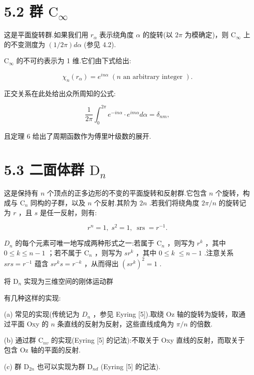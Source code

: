 \documentclass[10pt]{article}
\begin{document}
\section*{5.2 群 \({\mathrm{C}}_{\infty }\)}

这是平面旋转群.如果我们用 \({r}_{\alpha }\) 表示绕角度 \(\alpha\) 的旋转(以 \({2\pi }\) 为模确定)，则 \({\mathrm{C}}_{\infty }\) 上的不变测度为 \(\left( {1/{2\pi }}\right) {d\alpha }\) (参见 4.2).

\({\mathrm{C}}_{\infty }\) 的不可约表示为 1 维.它们由下式给出:

\[
{\chi }_{n}\left( {r}_{\alpha }\right)  = {e}^{in\alpha }\;\left( {n\text{ an arbitrary integer }}\right) .
\]

正交关系在此处给出众所周知的公式:

\[
\frac{1}{2\pi }{\int }_{0}^{2\pi }{e}^{-{in\alpha }} \cdot  {e}^{im\alpha }{d\alpha } = {\delta }_{nm},
\]

且定理 6 给出了周期函数作为傅里叶级数的展开.

\section*{5.3 二面体群 \({\mathrm{D}}_{n}\)}

这是保持有 \(n\) 个顶点的正多边形的不变的平面旋转和反射群.它包含 \(n\) 个旋转，构成与 \({\mathrm{C}}_{n}\) 同构的子群，以及 \(n\) 个反射.其阶为 \({2n}\) .若我们将绕角度 \({2\pi }/n\) 的旋转记为 \(r\) ，且 \(s\) 是任一反射，则有:

\[
{r}^{n} = 1,\;{s}^{2} = 1,\;\operatorname{srs} = {r}^{-1}.
\]

\({D}_{n}\) 的每个元素可唯一地写成两种形式之一:若属于 \({\mathrm{C}}_{n}\) ，则写为 \({r}^{k}\) ，其中 \(0 \leq  k \leq  n - 1\) ；若不属于 \({\mathrm{C}}_{n}\) ，则写为 \(s{r}^{k}\) ，其中 \(0 \leq  k \; \leq  n - 1\) .注意关系 \({srs} = {r}^{-1}\) 蕴含 \(s{r}^{k}s = {r}^{-k}\) ，从而得出 \({\left( s{r}^{k}\right) }^{2} = 1\) .

将 \({\mathrm{D}}_{n}\) 实现为三维空间的刚体运动群

有几种这样的实现:

(a) 常见的实现(传统记为 \({D}_{n}\) ，参见 Eyring [5]).取绕 Oz 轴的旋转为旋转，取通过平面 Oxy 的 \(n\) 条直线的反射为反射，这些直线成角为 \(\pi /n\) 的倍数.

(b) 通过群 \({\mathrm{C}}_{nv}\) 的实现(Eyring [5] 的记法):不取关于 Oxy 直线的反射，而取关于包含 Oz 轴的平面的反射.

(c) 群 \({\mathrm{D}}_{2n}\) 也可以实现为群 \({\mathrm{D}}_{nd}\) (Eyring [5] 的记法).
\end{document}
